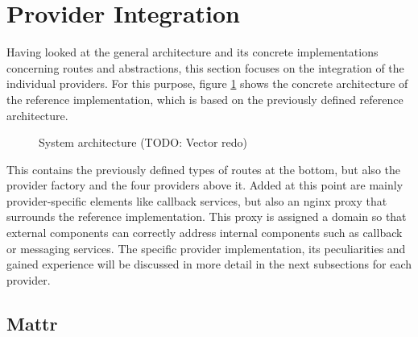         
    \section{Provider Integration}
    
    Having looked at the general architecture and its concrete implementations concerning routes and abstractions, this section focuses on the integration of the individual providers. For this purpose, figure \ref{figure: sys architecture} shows the concrete architecture of the reference implementation, which is based on the previously defined reference architecture. 
    
    \begin{figure}[ht]
        \centering
        \caption{System architecture (TODO: Vector redo)}
        \label{figure: sys architecture}
    \end{figure}
    
    This contains the previously defined types of routes at the bottom, but also the provider factory and the four providers above it. Added at this point are mainly provider-specific elements like callback services, but also an nginx proxy that surrounds the reference implementation. This proxy is assigned a domain so that external components can correctly address internal components such as callback or messaging services. The specific provider implementation, its peculiarities and gained experience will be discussed in more detail in the next subsections for each provider.
    
        \subsection{Mattr}
        
